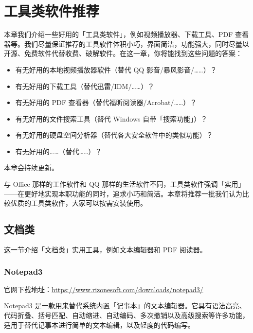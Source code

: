 \chapter{工具类软件推荐}
\label{cha:tools-software}

\begin{intro}
  本章我们介绍一些好用的「工具类软件」，例如视频播放器、下载工具、PDF 查看器等。我们尽量保证推荐的工具软件体积小巧，界面简洁，功能强大，同时尽量以开源、免费软件代替收费、破解软件。在这一章，你将能找到这些问题的答案：

  \begin{itemize}
    \item 有无好用的本地视频播放器软件（替代 QQ 影音/暴风影音/……）？
    \item 有无好用的下载工具（替代迅雷/IDM/……）？
    \item 有无好用的 PDF 查看器（替代福昕阅读器/Acrobat/……）？
    \item 有无好用的文件搜索工具（替代 Windows 自带「搜索功能」）？
    \item 有无好用的硬盘空间分析器（替代各大安全软件中的类似功能）？
    \item 有无好用的……（替代……）？
  \end{itemize}
\end{intro}

\begin{warning}
  本章会持续更新。
\end{warning}

与 Office 那样的工作软件和 QQ 那样的生活软件不同，工具类软件强调「实用」——在更好地实现本职功能的同时，追求小巧和简洁。本章将推荐一批我们认为比较优质的工具类软件，大家可以按需安装使用。

\section{文档类}

这一节介绍「文档类」实用工具，例如文本编辑器和 PDF 阅读器。

\subsection{Notepad3}

官网下载地址：\url{https://www.rizonesoft.com/downloads/notepad3/}

Notepad3 是一款用来替代系统内置「记事本」的文本编辑器。它具有语法高亮、代码折叠、括号匹配、自动缩进、自动编码、多次撤销以及高级搜索等许多功能，适用于替代记事本进行简单的文本编辑，以及轻度的代码编写。


